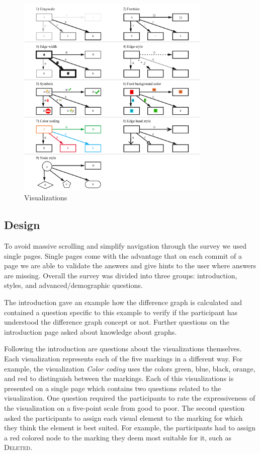 \documentclass{llncs}
\begin{document}
\begin{figure}
	\centering
	\includegraphics[width=350px]{Images/Overview.PNG}
	\caption{Visualizations}
	\label{fig:visualizations}
\end{figure}


\subsection{Design} %
\label{sec:Design}
To avoid massive scrolling and simplify navigation through the survey we used single pages. Single pages come with the advantage that on each commit of a page we are able to validate the answers and give hints to the user where answers are missing. Overall the survey was divided into three groups: introduction, styles, and advanced/demographic questions.

The introduction gave an example how the difference graph is calculated and contained a question specific to this example to verify if the participant has understood the difference graph concept or not. Further questions on the introduction page asked about knowledge about graphs.  

Following the introduction are questions about the visualizations themselves. Each visualization represents each of the five markings in a different way. For example, the visualization \emph{Color coding} uses the colors green, blue, black, orange, and red to distinguish between the markings. Each of this visualizations is presented on a single page which contains two questions related to the visualization. One question required the participants to rate the expressiveness of the visualization on a five-point scale from good to poor. The second question asked the participants to assign each visual element to the marking for which they think the element is best suited. For example, the participants had to assign a red colored node to the marking they deem most suitable for it, such as \textsc{Deleted}.
\end{document}
